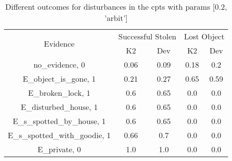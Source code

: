 \begin{table}\begin{tabular}{c|cc|cc}\toprule\multirow{2}{*}{Evidence} & \multicolumn{2}{c}{Successful Stolen} & \multicolumn{2}{c}{Lost Object} \\& {K2} & {Dev} & {K2} & {Dev} \\\midrule
no\_evidence, 0 & \cellcolor{Bittersweet}0.06&\cellcolor{Bittersweet}0.09&\cellcolor{Bittersweet}0.18&\cellcolor{Bittersweet}0.2\\E\_object\_is\_gone, 1 & \cellcolor{Bittersweet}0.21&\cellcolor{Bittersweet}0.27&\cellcolor{Bittersweet}0.65&\cellcolor{Bittersweet}0.59\\E\_broken\_lock, 1 & \cellcolor{Bittersweet}0.6&\cellcolor{Bittersweet}0.65&0.0&0.0\\E\_disturbed\_house, 1 & \cellcolor{Bittersweet}0.6&\cellcolor{Bittersweet}0.65&0.0&0.0\\E\_s\_spotted\_by\_house, 1 & \cellcolor{Bittersweet}0.6&\cellcolor{Bittersweet}0.65&0.0&0.0\\E\_s\_spotted\_with\_goodie, 1 & \cellcolor{Bittersweet}0.66&\cellcolor{Bittersweet}0.7&0.0&0.0\\E\_private, 0 & 1.0&1.0&0.0&0.0\\\bottomrule\end{tabular}\caption{Different outcomes for disturbances in the cpts with params [0.2, 'arbit']}\end{table}